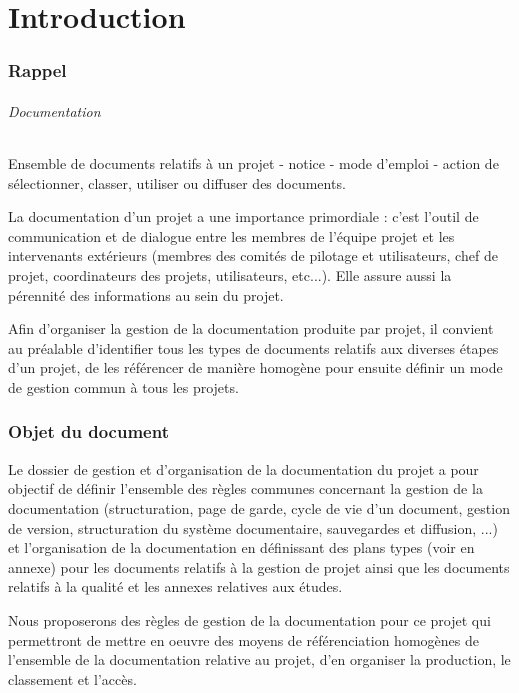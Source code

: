 \documentclass[a4paper]{article}
\begin{document}
\part{Introduction}

\section{Rappel}

\paragraph{Documentation} Ensemble de documents relatifs à un projet - notice - mode d’emploi - action de sélectionner, classer, utiliser ou diffuser des documents.

La documentation d’un projet a une importance primordiale : c’est l’outil de communication et de dialogue entre les membres de l’équipe projet et les intervenants extérieurs (membres des comités de pilotage et utilisateurs, chef de projet, coordinateurs des projets, utilisateurs, etc...). Elle assure aussi la pérennité des informations au sein du projet.

Afin d’organiser la gestion de la documentation produite par projet, il convient au préalable d’identifier tous les types de documents relatifs aux diverses étapes d’un projet, de les référencer de manière homogène pour ensuite définir un mode de gestion commun à tous les projets.

\section{Objet du document}

Le dossier de gestion et d'organisation de la documentation du projet a pour objectif de définir l’ensemble des règles
communes concernant la gestion de la documentation (structuration, page de garde, cycle de vie d’un
document, gestion de version, structuration du système documentaire, sauvegardes et diffusion, ...) et
l’organisation de la documentation en définissant des plans types (voir en annexe) pour les documents relatifs à la gestion de
projet ainsi que les documents relatifs à la qualité et les annexes relatives aux études.

Nous proposerons des règles de gestion de la documentation pour ce projet qui permettront de mettre en oeuvre des moyens
de référenciation homogènes de l'ensemble de la documentation relative au projet, d'en organiser la production, le classement
et l'accès.
\end{document}
